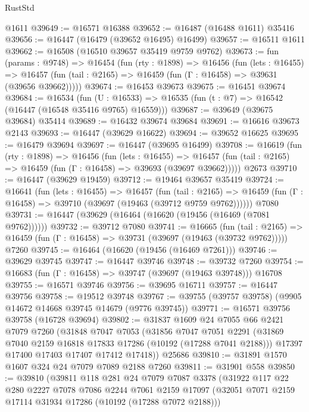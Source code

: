 \begin{lexlean}{RustStd}
\begin{coremodule}
    @1611
@39649 := @16571 @16388
@39652 := @16487 (@16488 @1611) @35416
@39656 := @16447 (@16479 (@39652 @16495) @16499)
@39657 := @16511 @1611
@39662 := @16508 (@16510 @39657 @35419 @9759 @9762)
@39673 := fun (params : @9748) =>
  @16454
    (fun (rty : @1898) =>
    @16456
      (fun (lets : @16455) =>
      @16457 (fun (tail : @2165) => @16459 (fun (Γ : @16458) => @39631 (@39656 @39662)))))
@39674 := @16453 @39673
@39675 := @16451 @39674
@39684 := @16534
    (fun (U : @16533) => @16535 (fun (t : @7) => @16542 (@16447 (@16548 @35416 @9765) @16559)))
@39687 := @39649 (@39675 @39684) @35414
@39689 := @16432 @39674 @39684
@39691 := @16616 @39673 @2143
@39693 := @16447 (@39629 @16622)
@39694 := @39652 @16625
@39695 := @16479 @39694
@39697 := @16447 (@39695 @16499)
@39708 := @16619
    (fun (rty : @1898) =>
    @16456
      (fun (lets : @16455) =>
      @16457 (fun (tail : @2165) => @16459 (fun (Γ : @16458) => @39693 (@39697 @39662)))))
    @2673
@39710 := @16447 (@39629 @19459)
@39712 := @19464 @39657 @35419
@39724 := @16641
    (fun (lets : @16455) =>
    @16457
      (fun (tail : @2165) =>
      @16459 (fun (Γ : @16458) => @39710 (@39697 (@19463 (@39712 @9759 @9762))))))
    @7080
@39731 := @16447 (@39629 (@16464 (@16620 (@19456 (@16469 (@7081 @9762))))))
@39732 := @39712 @7080
@39741 := @16665
    (fun (tail : @2165) => @16459 (fun (Γ : @16458) => @39731 (@39697 (@19463 (@39732 @9762)))))
    @7260
@39745 := @16464 (@16620 (@19456 (@16469 @7261)))
@39746 := @39629 @39745
@39747 := @16447 @39746
@39748 := @39732 @7260
@39754 := @16683 (fun (Γ : @16458) => @39747 (@39697 (@19463 @39748))) @16708
@39755 := @16571 @39746
@39756 := @39695 @16711
@39757 := @16447 @39756
@39758 := @19512 @39748
@39767 := @39755 (@39757 @39758) (@9905 @14672 @14668 @39745 @14679 (@9776 @39745))
@39771 := @16571 @39756 @39758 (@16728 @39694)
@39802 := @31837
    @1609
    @24
    @7055
    @66
    @2421
    @7079
    @7260
    (@31848
      @7047
      @7053
      (@31856
        @7047
        @7051
        @2291
        (@31869 @7040 @2159 @16818 @17833 @17286 (@10192 (@17288 @7041 @2188)))
        @17397
        @17400
        @17403
        @17407
        @17412
        @17418))
    @25686
@39810 := @31891 @1570 @1607 @324 @24 @7079 @7089 @2188 @7260
@39811 := @31901 @558
@39850 := @39810
    (@39811
      @118
      @281
      @24
      @7079
      @7087
      @3378
      (@31922
        @117
        @22
        @280
        @2227
        @7078
        @7086
        @2244
        @7061
        @2159
        @17097
        (@32051 @7071 @2159 @17114 @31934 @17286 (@10192 (@17288 @7072 @2188)))

\end{coremodule}
\end{lexlean}

